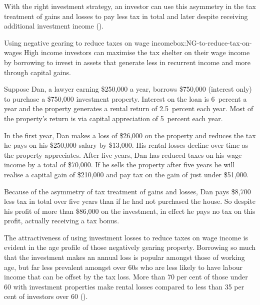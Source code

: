 \documentclass{grattanAlpha}\usepackage[]{graphicx}\usepackage[]{color}
\begin{document}
With the right investment strategy, an investor can use this asymmetry
in the tax treatment of gains and losses to pay less tax in total and
later despite receiving additional investment income ().

\begin{smallbox}{Using negative gearing to reduce taxes on wage income}{box:NG-to-reduce-tax-on-wages}
High income investors can maximise the tax shelter on their wage income
by borrowing to invest in assets that generate less in recurrent income
and more through capital gains.



Suppose Dan, a lawyer earning \$250,000 a year, 
borrows \$750,000 %
(interest only)
to purchase a \$750,000 investment property. Interest on the loan is 6~percent a
year and the property generates a rental return of 2.5~percent each
year. Most of the property's return is via capital appreciation of 5~percent each year.

In the first year, Dan makes a loss of \$26,000 
on the property and
reduces the tax he pays on his \$250,000 salary by 
\$13,000. His rental
losses decline over time as the property appreciates. After five years,
Dan has reduced taxes on his wage income by a total of 
\$70,000. If he
sells the property after five years he will realise a capital gain of
\$210,000 and pay tax on 
the gain of just under \$51,000.

Because of the asymmetry of tax treatment of gains and losses, Dan pays
\$8,700 less tax in total over five years than if he had not purchased
the house. So despite his profit of more than \$86,000 on the
investment, in effect he pays no tax on this profit, actually receiving a tax bonus.
\end{smallbox}
The attractiveness of using investment losses to reduce taxes on wage income is evident in the age profile of those negatively gearing property. Borrowing so much that the investment makes an annual loss is popular amongst those of working age, but far less prevalent amongst over 60s who are less likely to have labour income that can be offset by the tax loss. More than 70 per cent of those under 60 with investment properties make rental losses compared to less than 35 per cent of investors over 60 ().
\end{document}
